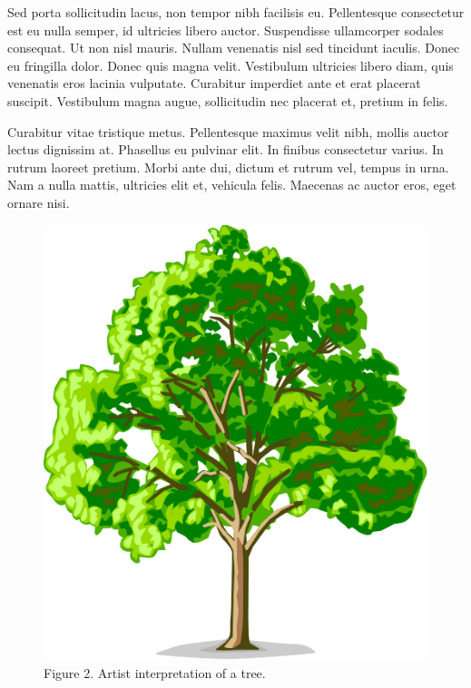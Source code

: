 \documentclass{article}
\begin{document}
 Sed porta sollicitudin lacus, non tempor nibh facilisis eu. Pellentesque consectetur est eu nulla semper, id ultricies libero auctor. Suspendisse ullamcorper sodales consequat. Ut non nisl mauris. Nullam venenatis nisl sed tincidunt iaculis. Donec eu fringilla dolor. Donec quis magna velit. Vestibulum ultricies libero diam, quis venenatis eros lacinia vulputate. Curabitur imperdiet ante et erat placerat suscipit. Vestibulum magna augue, sollicitudin nec placerat et, pretium in felis. 



 Curabitur vitae tristique metus. Pellentesque maximus velit nibh, mollis auctor lectus dignissim at. Phasellus eu pulvinar elit. In finibus consectetur varius. In rutrum laoreet pretium. Morbi ante dui, dictum et rutrum vel, tempus in urna. Nam a nulla mattis, ultricies elit et, vehicula felis. Maecenas ac auctor eros, eget ornare nisi. 


\begin{figure}[h]
\centering
\includegraphics{tree.gif}
\captionsetup{labelformat=empty} \caption{Figure 2. Artist interpretation of a tree.}
\end{figure}
\end{document}
